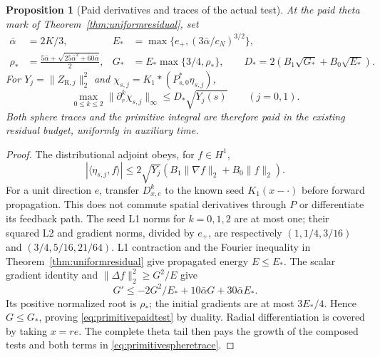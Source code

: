 \documentclass[11pt]{article}
\numberwithin{equation}{section}
\newtheorem{proposition}[theorem]{Proposition}
\begin{document}
\begin{proposition}[Paid derivatives and traces of the actual test]
\label{prop:primitivepaidtest}
At the paid theta mark of Theorem~\ref{thm:uniformresidual}, set
\begin{align*}
 \bar\alpha&=2K/3,&
 E_*&=\max\{e_+,(3\bar\alpha/c_N)^{3/2}\},\\
 \rho_*&=\frac{5\bar\alpha+
              \sqrt{25\bar\alpha^2+60\bar\alpha}}2,&
 G_*&=E_*\max\{3/4,\rho_*\},\qquad
 D_*=2(B_1\sqrt{G_*}+B_0\sqrt{E_*}).
\end{align*}
For $Y_j=\|Z_{\mathrm R,j}\|_2^2$ and
$\chi_{s,j}=K_1*(P_{s,0}^*\eta_{s,j})$,
\begin{equation}\label{eq:primitivepaidtest}
 \max_{0\le k\le2}\|\partial_r^k\chi_{s,j}\|_\infty
 \le D_*\sqrt{Y_j(s)}\qquad(j=0,1).
\end{equation}
Both sphere traces and the primitive integral are therefore paid in the
existing residual budget, uniformly in auxiliary time.
\end{proposition}
\begin{proof}
The distributional adjoint obeys, for $f\in H^1$,
\[
 |\langle\eta_{s,j},f\rangle|
 \le2\sqrt{Y_j}(B_1\|\nabla f\|_2+B_0\|f\|_2).
\]
For a unit direction $e$, transfer $D_{x,e}^k$ to the known seed
$K_1(x-\cdot)$ before forward propagation. This does not commute
spatial derivatives through $P$ or differentiate its feedback path.
The seed L1 norms for $k=0,1,2$ are at most one; their squared L2 and
gradient norms, divided by $e_+$, are respectively
$(1,1/4,3/16)$ and $(3/4,5/16,21/64)$.
L1 contraction and the Fourier inequality in
Theorem~\ref{thm:uniformresidual} give propagated energy $E\le E_*$.
The scalar gradient identity and $\|\Delta f\|_2^2\ge G^2/E$ give
\[
 G'\le-2G^2/E_*+10\bar\alpha G+30\bar\alpha E_*.
\]
Its positive normalized root is $\rho_*$; the initial gradients are
at most $3E_*/4$. Hence $G\le G_*$, proving
\eqref{eq:primitivepaidtest} by duality. Radial differentiation is
covered by taking $x=re$.
The complete theta tail then pays the growth of the composed tests
and both terms in \eqref{eq:primitivespheretrace}.
\end{proof}
\end{document}
